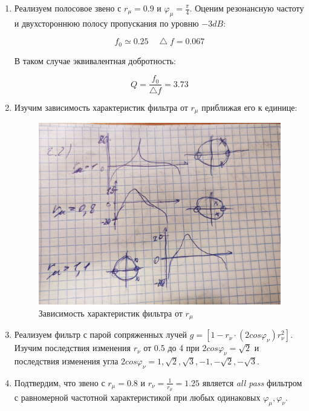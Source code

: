 \documentclass[a4paper, 12pt]{article}%
\begin{document}
\begin{enumerate}
\item Реализуем полосовое звено с $r_{\mu} = 0.9$ и $\varphi_{\mu} = \frac{\pi}{4}$. Оценим резонансную частоту и двухстороннюю полосу пропускания по уровню $-3 dB$:

\[f_0 \simeq 0.25 \quad \bigtriangleup f = 0.067\]

В таком случае эквивалентная добротность:

\[Q = \frac{f_0}{\bigtriangleup f} = 3.73\]

\item Изучим зависимость характеристик фильтра от $r_{\mu}$ приближая его к единице:

\begin{figure}[h!]
\centering
\includegraphics[scale=0.2]{images/2.2.jpg}
\caption{Зависимость характеристик фильтра от $r_{\mu}$}
\label{2.2}
\end{figure}

\item Реализуем фильтр с парой сопряженных лучей $g = [1 - r_{\nu} \cdot (2 cos \varphi_{\nu}) r_{\nu}^2]$. Изучим последствия изменения $r_{\nu}$ от 0.5 до 4 при $2 cos \varphi_{\nu} = \sqrt{2}$ и последствия изменения угла $2 cos \varphi_{\nu} = 1, \sqrt{2}, \sqrt{3}, -1, -\sqrt{2}, -\sqrt{3}$.

\item Подтвердим, что звено с $r_{\mu} = 0.8$ и $r_{\nu} = \frac{1}{r_{\mu}} = 1.25$ является \textit{all pass} фильтром с равномерной частотной характеристикой при любых одинаковых $\varphi_{\mu}, \varphi_{\nu}$.
\end{enumerate}
\end{document}
